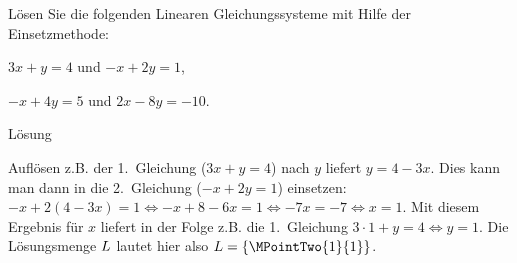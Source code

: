 \begin{MExercises}
\begin{MExercise}
Lösen Sie die folgenden Linearen Gleichungssysteme mit Hilfe der Einsetzmethode:
\begin{MExerciseItems}
\item{$3 x + y = 4$ und $- x + 2 y = 1$,}
\item{$- x + 4 y = 5$ und $2 x - 8 y = - 10$.}
\end{MExerciseItems}

\begin{MHint}{Lösung}
\begin{MExerciseItems}
\item{Auflösen z.B. der 1.~Gleichung ($3 x + y = 4$) nach $y$ liefert $y = 4 - 3 x$. Dies kann man dann in die 2.~Gleichung
($- x + 2 y = 1$) einsetzen: $- x + 2 (4 - 3 x) = 1 \Leftrightarrow - x + 8 - 6 x = 1 \Leftrightarrow - 7 x = - 7
\Leftrightarrow x = 1$. Mit diesem Ergebnis für $x$ liefert in der Folge z.B. die 1.~Gleichung $3 \cdot 1 + y = 4
\Leftrightarrow y = 1$. Die Lösungsmenge $L$ lautet hier also ${\ML} = \{ \MPointTwo{1}{1} \}$.

}
\end{MExerciseItems}
\end{MHint}
\end{MExercise}
\end{MExercises}
